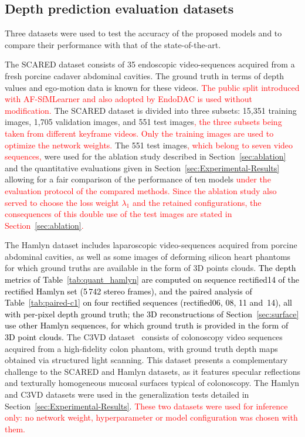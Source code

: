 \documentclass[a4paper,fleqn]{cas-dc}
\begin{document}
\subsection{Depth prediction evaluation datasets}
Three datasets were used to test the accuracy of the proposed models and to compare their performance with that of the state-of-the-art. 

The SCARED dataset consists of 35 endoscopic video-sequences acquired from a fresh porcine cadaver abdominal cavities. The ground truth in terms of depth values and ego-motion data is known for these videos. \textcolor{red}{The public split introduced with AF-SfMLearner \citep{Shao_MIA_2022} and also adopted by EndoDAC \citep{EndoDAC_MICCAI_2024} is used without modification.} The SCARED dataset is divided into three subsets: 15,351 training images, 1,705 validation images, and 551 test images\textcolor{red}{, the three subsets being taken from different keyframe videos. Only the training images are used to optimize the network weights.} The 551 test images\textcolor{red}{, which belong to seven video sequences,} were used for the ablation study described in Section~\ref{sec:ablation} and the quantitative evaluations given in Section~\ref{sec:Experimental-Results} allowing for a fair comparison of the performance of ten models\textcolor{red}{ under the evaluation protocol of the compared methods. Since the ablation study also served to choose the loss weight $\lambda_1$ and the retained configurations, the consequences of this double use of the test images are stated in Section~\ref{sec:ablation}.}


The Hamlyn dataset \citep{Recasens_IEEERAL_2021} includes laparoscopic video-sequences acquired from porcine abdominal cavities, as well as some images of deforming silicon heart phantoms for which ground truths are available in the form of 3D points clouds. \textcolor{black}{ The depth metrics of Table~\ref{tab:quant_hamlyn} are computed on sequence rectified14 of the rectified Hamlyn set (5\,742 stereo frames), and the paired analysis of Table~\ref{tab:paired-c1} on four rectified sequences (rectified06, 08, 11 and~14), all with per-pixel depth ground truth; the 3D reconstructions of Section~\ref{sec:surface} use other Hamlyn sequences, for which ground truth is provided in the form of 3D point clouds.} The C3VD dataset~\citep{bobrow2023colonoscopy} consists of colonoscopy video sequences acquired from a 
high-fidelity colon phantom, with ground truth depth maps obtained via structured light scanning. This dataset presents a complementary challenge to the SCARED and Hamlyn datasets, as it features specular reflections and texturally homogeneous mucosal surfaces typical of colonoscopy. The Hamlyn and C3VD datasets were used in the generalization tests detailed in Section~\ref{sec:Experimental-Results}. \textcolor{red}{These two datasets were used for inference only: no network weight, hyperparameter or model configuration was chosen with them.} 
\end{document}
